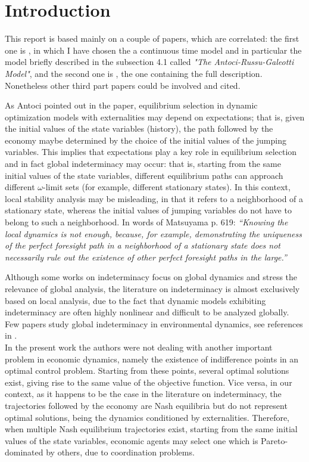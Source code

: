 \section{Introduction}\label{sec:introduction} 
This report is based mainly on a couple of papers, which are correlated: the first one is \cite{caravaggio_nonlinear_2018}, in which I have chosen the a continuous time model and in particular the model briefly described in the subsection 4.1 called \textit{"The Antoci-Russu-Galeotti Model"}, and the second one is \cite{antoci_poverty_2011}, the one containing the full description. Nonetheless other third part papers could be involved and cited. 

As Antoci \cite{antoci_poverty_2011} pointed out in the paper, equilibrium selection in dynamic optimization models with externalities may depend on expectations; that is, given the initial values of the state variables (history), the path followed by the economy maybe determined by the choice of the initial values of the jumping variables. This implies that expectations play a key role in equilibrium selection and in fact global indeterminacy may occur: that is, starting from the same initial values of the state variables, different equilibrium paths can approach different $\omega$-limit sets (for example, different stationary states). In this context, local stability analysis may be misleading, in that it refers to a neighborhood of a stationary state, whereas the initial values of jumping variables do not have to belong to such a neighborhood. In words of Matsuyama \cite{matsuyama_increasing_1991} p. 619:
\textit{“Knowing the local dynamics is not enough, because, for example, demonstrating the uniqueness of the perfect foresight path in a neighborhood of a stationary state does not necessarily rule out the existence of other perfect foresight paths in the large.”}

Although some works on indeterminacy focus on global dynamics and stress the relevance of global analysis, the literature on indeterminacy is almost exclusively based on local analysis, due to the fact that dynamic models exhibiting indeterminacy are often highly nonlinear and difficult to be analyzed globally. Few papers study global indeterminacy in environmental dynamics, see references in \cite{antoci_poverty_2011}. \\
In the present work the authors were not dealing with another important problem in economic dynamics, namely the existence of indifference points in an optimal control problem. Starting from these points, several optimal solutions exist, giving rise to the same value of the objective function. Vice versa, in our context, as it happens to be the case in the literature on indeterminacy, the trajectories followed by the economy are Nash equilibria but do not represent optimal solutions, being the dynamics conditioned by externalities. Therefore, when multiple Nash equilibrium trajectories exist, starting from the same initial values of the state variables, economic agents may select one which is Pareto-dominated by others, due to coordination problems.

